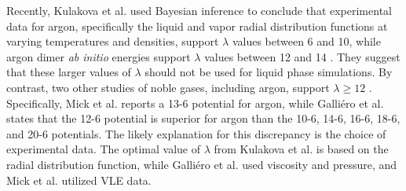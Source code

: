 \documentclass[preprint,letterpaper,floatfix,citeautoscript,aip,jcp]{revtex4-1}
\begin{document}
Recently, Kulakova et al. used Bayesian inference to conclude that experimental data for argon, specifically the liquid and vapor radial distribution functions at varying temperatures and densities, support $\lambda$ values between 6 and 10, while argon dimer \textit{ab initio} energies support $\lambda$ values between 12 and 14 \cite{Kulakova2017}. They suggest that these larger values of $\lambda$ should not be used for liquid phase simulations. By contrast, two other studies of noble gases, including argon, support $\lambda \ge 12$ \cite{Galliero2005,Mick_Mie}. Specifically, Mick et al. reports a 13-6 potential for argon, while Galli{\'e}ro et al. states that the 12-6 potential is superior for argon than the 10-6, 14-6, 16-6, 18-6, and 20-6 potentials. The likely explanation for this discrepancy is the choice of experimental data. The optimal value of $\lambda$ from Kulakova et al. is based on the radial distribution function, while Galli{\'e}ro et al. used viscosity and pressure, and Mick et al. utilized VLE data.
\end{document}
